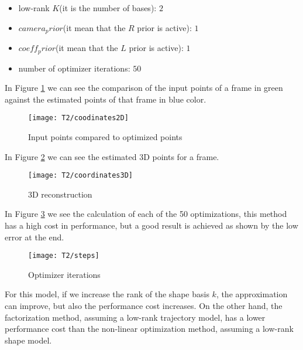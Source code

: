 \begin{itemize}
\item low-rank $K$(it is the number of bases): $2$
\item $camera_prior$(it mean that the $R$ prior is active): $1$
\item $coeff_prior$(it mean that the $L$ prior is active): $1$
\item number of optimizer iterations: $50$
\end{itemize}
\noindent In Figure \ref{fig:coodinates2D} we can see the comparison of the input points of a frame in green against the estimated points of that frame in blue color.\\

\begin{figure}[h]
    \centering
    \texttt{[image: T2/coodinates2D]}
    \caption{Input points compared to optimized points}
    \label{fig:coodinates2D}
\end{figure}

\noindent In Figure \ref{fig:coordinates3D} we can see the estimated 3D points for a frame.\\ 
\begin{figure}[h]
    \centering
    \texttt{[image: T2/coordinates3D]}
    \caption{3D reconstruction}
    \label{fig:coordinates3D}
\end{figure}

\noindent In Figure \ref{fig:steps} we see the calculation of each of the 50 optimizations, this method has a high cost in performance, but a good result is achieved as shown by the low error at the end.\\
\begin{figure}[h]
    \centering
    \texttt{[image: T2/steps]}
    \caption{Optimizer iterations}
    \label{fig:steps}
\end{figure}

\noindent For this model, if we increase the rank of the shape basis $k$, the approximation can improve, but also the performance cost increases. On the other hand, the factorization method, assuming a low-rank trajectory model, has a lower performance cost than the non-linear optimization method, assuming a low-rank shape model. 

